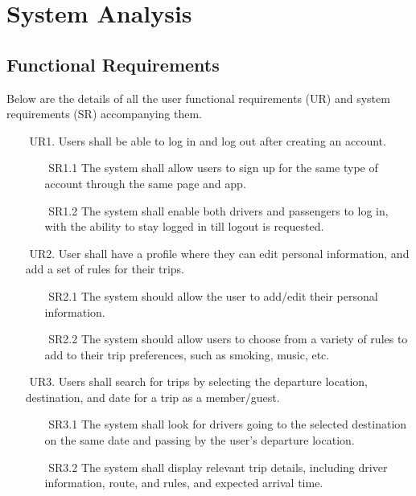 \documentclass[a4paper, 12pt]{report} %
\begin{document}
    \pagebreak
    \section{System Analysis}  
        \subsection{Functional Requirements}
            Below are the details of all the user functional requirements (UR) and system requirements (SR) accompanying them.
           \begin{itemize}
                \item [$ $] UR1. Users shall be able to log in and log out after creating an account.
                \begin{itemize}
                    \item [$ $]SR1.1 The system shall allow users to sign up for the same type of account through the same page and app.
                    \item [$ $]SR1.2 The system shall enable both drivers and passengers to log in, with the ability to stay logged in till logout is requested.
                \end{itemize}
                \item [$ $] UR2. User shall have a profile where they can edit personal information, and add a set of rules for their trips.
                \begin{itemize}
                    \item [$ $] SR2.1 The system should allow the user to add/edit their personal information.
                    \item [$ $] SR2.2 The system should allow users to choose from a variety of rules to add to their trip preferences, such as smoking, music, etc.
                \end{itemize}
                \item [$ $] UR3. Users shall search for trips by selecting the departure location, destination, and date for a trip as a member/guest.
                \begin{itemize}
                    \item [$ $] SR3.1 The system shall look for drivers going to the selected destination on the same date and passing by the user’s departure location.
                    \item [$ $] SR3.2 The system shall display relevant trip details, including driver information, route, and rules, and expected arrival time. 

\end{itemize}
\end{itemize}
\end{document}
